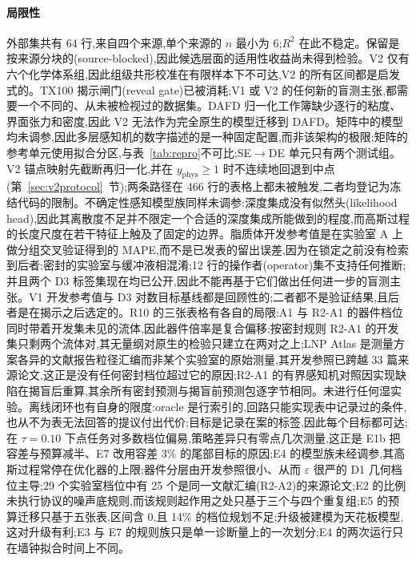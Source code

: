 \documentclass[11pt,a4paper]{ctexart}
\begin{document}
\paragraph{局限性} 外部集共有 64 行,来自四个来源,单个来源的 $n$ 最小为 6;$R^2$ 在此不稳定。保留是按来源分块的(source-blocked),因此候选层面的适用性收益尚未得到检验。V2 仅有六个化学体系组,因此组级共形校准在有限样本下不可达,V2 的所有区间都是启发式的。TX100 揭示闸门(reveal gate)已被消耗;V1 或 V2 的任何新的盲测主张,都需要一个不同的、从未被检视过的数据集。DAFD 归一化工作簿缺少逐行的粘度、界面张力和密度,因此 V2 无法作为完全原生的模型迁移到 DAFD。矩阵中的模型均未调参,因此多层感知机的数字描述的是一种固定配置,而非该架构的极限;矩阵的参考单元使用拟合分区,与表~\ref{tab:repro}不可比;SE$\to$DE 单元只有两个测试组。V2 锚点映射先截断再归一化,并在 $y_{\mathrm{phys}}\ge 1$ 时不连续地回退到中点(第~\ref{sec:v2protocol}~节);两条路径在 466 行的表格上都未被触发,二者均登记为冻结代码的限制。不确定性感知模型族同样未调参:深度集成没有似然头(likelihood head),因此其离散度不足并不限定一个合适的深度集成所能做到的程度,而高斯过程的长度尺度在若干特征上触及了固定的边界。脂质体开发参考值是在实验室 A 上做分组交叉验证得到的 MAPE,而不是已发表的留出误差,因为在锁定之前没有检索到后者;密封的实验室与缓冲液相混淆;12 行的操作者(operator)集不支持任何推断;并且两个 D3 标签集现在均已公开,因此不能再基于它们做出任何进一步的盲测主张。V1 开发参考值与 D3 对数目标基线都是回顾性的;二者都不是验证结果,且后者是在揭示之后选定的。R10 的三张表格有各自的局限:A1 与 R2-A1 的器件档位同时带着开发集未见的流体,因此器件倍率是复合偏移;按密封规则 R2-A1 的开发集只剩两个流体对,其无量纲对原生的检验只建立在两对之上;LNP Atlas 是测量方案各异的文献报告粒径汇编而非某个实验室的原始测量,其开发参照已跨越 33 篇来源论文,这正是没有任何密封档位超过它的原因;R2-A1 的有界感知机对照因实现缺陷在揭盲后重算,其余所有密封预测与揭盲前预测包逐字节相同。未进行任何湿实验。离线闭环也有自身的限度:oracle 是行索引的,回路只能实现表中记录过的条件,也从不为表无法回答的提议付出代价;目标是记录在案的标签,因此每个目标都可达;在 $\tau = 0.10$ 下点任务对多数档位偏易,策略差异只有零点几次测量,这正是 E1b 把容差与预算减半、E7 改用容差 3\% 的尾部目标的原因;E4 的模型族未经调参,其高斯过程常停在优化器的上限;器件分层由开发参照很小、从而 $\varepsilon$ 很严的 D1 几何档位主导;29 个实验室档位中有 25 个是同一文献汇编(R2-A2)的来源论文;E2 的比例未执行协议的噪声底规则,而该规则起作用之处只基于三个与四个重复组;E5 的预算迁移只基于五张表,区间含 0,且 14\% 的档位规划不足;升级被建模为天花板模型,这对升级有利;E3 与 E7 的规则族只是单一诊断量上的一次划分;E4 的两次运行只在墙钟拟合时间上不同。
\end{document}
